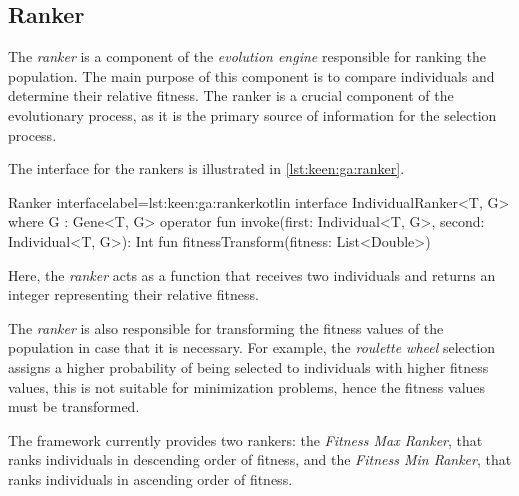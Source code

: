 \subsection{Ranker}
\label{sec:keen:ga:ranker}

  The \emph{ranker} is a component of the \emph{evolution engine} responsible for
  ranking the population.
  The main purpose of this component is to compare individuals and determine their
  relative fitness.
  The ranker is a crucial component of the evolutionary process, as it is the
  primary source of information for the selection process.

  The interface for the rankers is illustrated in \vref{lst:keen:ga:ranker}.

  \begin{code}{Ranker interface}{label=lst:keen:ga:ranker}{kotlin}
    interface IndividualRanker<T, G> where G : Gene<T, G> {
        operator fun invoke(first: Individual<T, G>, second: Individual<T, G>): Int
        fun fitnessTransform(fitness: List<Double>)
    }
  \end{code}

  Here, the \emph{ranker} acts as a function that receives two individuals and
  returns an integer representing their relative fitness.
  
  The \emph{ranker} is also responsible for transforming the fitness values of
  the population in case that it is necessary.
  For example, the \textit{roulette wheel} selection assigns a higher 
  probability of being selected to individuals with higher fitness values, this
  is not suitable for minimization problems, hence the fitness values must be
  transformed.

  The framework currently provides two rankers: the \textit{Fitness Max Ranker},
  that ranks individuals in descending order of fitness, and the \textit{Fitness
  Min Ranker}, that ranks individuals in ascending order of fitness.
